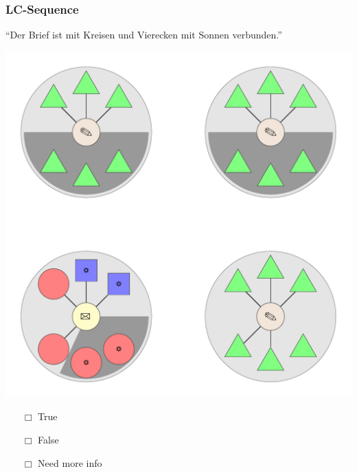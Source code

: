 \documentclass[fleqn,10pt,xcolor=dvipsnames]{beamer}
\newcommand{\LC}{LC\xspace}
\newcommand{\mymark}[1]{{\color{mycol}{#1}}}
\begin{document}
\begin{frame}
  \frametitle{\LC-Sequence}
  \begin{center}
    ``Der Brief ist mit Kreisen und Vierecken mit Sonnen verbunden.''

    \vspace{0.1cm}

    \includegraphics[width=0.5 \textwidth]{../../pictures/lc_01_5.pdf}

    \vspace{0.1cm}

    \begin{multicols}{3}
      \begin{itemize} 
      \item[$\Box$] True\\
        \onslide<2>{$\leadsto$  \mymark{false}}
      \item[$\Box$] False\\
        \onslide<2>{$\leadsto$ \mymark{false}}
      \item[$\Box$] Need more info 
      \end{itemize}
    \end{multicols}

  \end{center}
\end{frame}
\end{document}
